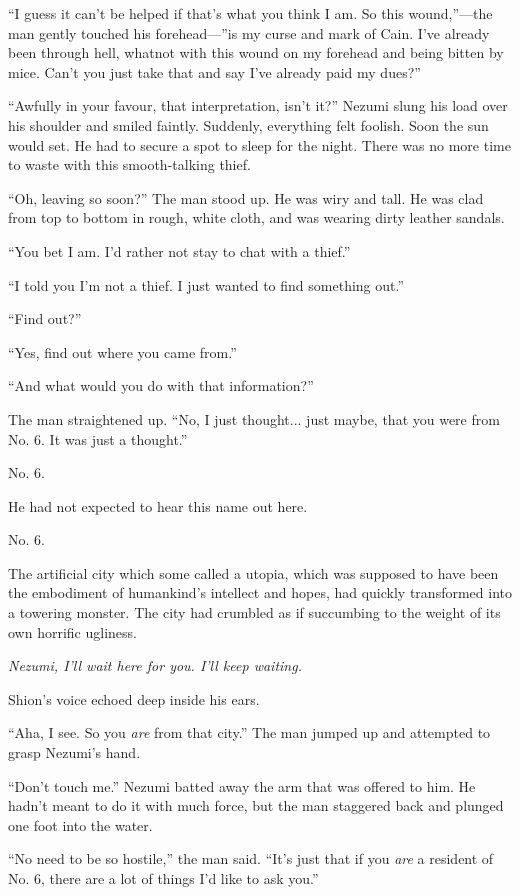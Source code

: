 ``I guess it can't be helped if that's what you think I am. So this
wound,''---the man gently touched his forehead---''is my curse and mark of
Cain. I've already been through hell, whatnot with this wound on my
forehead and being bitten by mice. Can't you just take that and say I've
already paid my dues?''

``Awfully in your favour, that interpretation, isn't it?'' Nezumi slung
his load over his shoulder and smiled faintly. Suddenly, everything felt
foolish. Soon the sun would set. He had to secure a spot to sleep for
the night. There was no more time to waste with this smooth-talking
thief.

``Oh, leaving so soon?'' The man stood up. He was wiry and tall. He was
clad from top to bottom in rough, white cloth, and was wearing dirty
leather sandals.

``You bet I am. I'd rather not stay to chat with a thief.''

``I told you I'm not a thief. I just wanted to find something out.''

``Find out?''

``Yes, find out where you came from.''

``And what would you do with that information?''

The man straightened up. ``No, I just thought... just maybe, that you
were from No. 6. It was just a thought.''

No. 6.

He had not expected to hear this name out here.

No. 6.

The artificial city which some called a utopia, which was supposed to
have been the embodiment of humankind's intellect and hopes, had quickly
transformed into a towering monster. The city had crumbled as if
succumbing to the weight of its own horrific ugliness.

\emph{Nezumi, I'll wait here for you. I'll keep waiting.}

Shion's voice echoed deep inside his ears.

``Aha, I see. So you \emph{are} from that city.'' The man jumped up and
attempted to grasp Nezumi's hand.

``Don't touch me.'' Nezumi batted away the arm that was offered to him.
He hadn't meant to do it with much force, but the man staggered back and
plunged one foot into the water.

``No need to be so hostile,'' the man said. ``It's just that if you \emph{are}
a resident of No. 6, there are a lot of things I'd like to ask you.''

